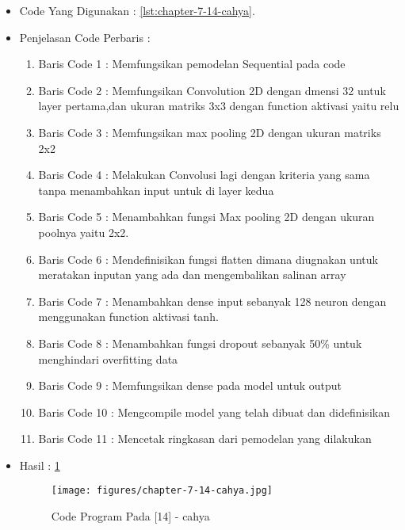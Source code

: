 \begin{itemize}
\item Code Yang Digunakan : \ref{lst:chapter-7-14-cahya}.

\par
\par
\item Penjelasan Code Perbaris : 
\begin{enumerate}
\item Baris Code 1	: Memfungsikan pemodelan Sequential pada code
\item Baris Code 2	: Memfungsikan Convolution 2D dengan dmensi 32 untuk layer pertama,dan ukuran matriks 3x3 dengan function aktivasi yaitu relu
\item Baris Code 3	: Memfungsikan max pooling 2D dengan ukuran matriks 2x2
\item Baris Code 4	: Melakukan Convolusi lagi dengan kriteria yang sama tanpa menambahkan input untuk di layer kedua
\item Baris Code 5	: Menambahkan fungsi Max pooling 2D dengan ukuran poolnya yaitu 2x2.
\item Baris Code 6	: Mendefinisikan fungsi flatten dimana diugnakan untuk meratakan inputan yang ada dan mengembalikan salinan array
\item Baris Code 7	: Menambahkan dense input sebanyak 128 neuron dengan menggunakan function aktivasi tanh.
\item Baris Code 8	: Menambahkan fungsi dropout sebanyak 50\% untuk menghindari overfitting data
\item Baris Code 9	: Memfungsikan dense pada model untuk output
\item Baris Code 10	: Mengcompile model yang telah dibuat dan didefinisikan
\item Baris Code 11	: Mencetak ringkasan dari pemodelan yang dilakukan
\end{enumerate}
\par
\item Hasil : \ref{chapter-7-14-cahya}
\par
\par
\begin{figure}[!hbtp]
\centering
\texttt{[image: figures/chapter-7-14-cahya.jpg]}
\caption{Code Program Pada  [14] - cahya}
\label{chapter-7-14-cahya}
\end{figure}
\par
\par
\end{itemize}
